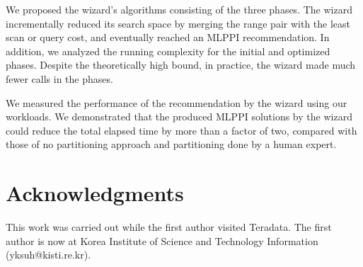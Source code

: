 \documentclass[runningheads]{comsis2}
\begin{document}
We proposed the wizard's algorithms consisting of the three phases. 
The wizard incrementally reduced its search space by merging 
the range pair with the least scan or query cost, and eventually reached an MLPPI recommendation. 
In addition, we analyzed the running complexity for the initial and optimized phases. 
Despite the theoretically high bound, in practice, the wizard made much fewer calls in the phases.

We measured the performance of the recommendation by the wizard using 
our workloads.  
We demonstrated that the produced MLPPI solutions by 
the wizard could reduce the total elapsed time by more than a factor of two, 
compared with those of no partitioning approach and partitioning 
done by a human expert. 

\section*{Acknowledgments} 
This work was carried out while the first author visited Teradata. 
The first author is now at Korea Institute of Science and Technology Information (yksuh@kisti.re.kr).

{\footnotesize


}
\end{document}
